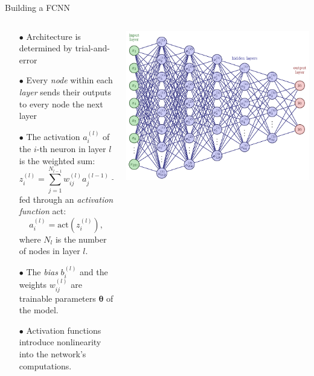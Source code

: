 \documentclass[aspectratio=169, 9pt]{beamer}
\begin{document}
\begin{frame}{Building a FCNN}
  \begin{columns}
    \begin{column}{0.5\textwidth}
      \begin{itemize}
        \item[$\bullet$] Architecture is determined by trial-and-error
        \item[$\bullet$] Every \emph{node} within each \emph{layer} sends their outputs to every node the next layer
        \item[$\bullet$] The activation $a_i^{(l)}$ of the $i$-th neuron in layer $l$ is the weighted sum:
          \begin{equation}
           z_i^{(l)} = \sum_{j=1}^{N_{l-1}}w_{ij}^{(l)}a_j^{(l-1)} + b_i^{(l)}
          \end{equation}
        fed through an \emph{activation function} act:
        \begin{equation}
          a_i^{(l)} = \text{act} \left( z_i^{(l)} \right),
        \end{equation}
          where $N_{l}$ is the number of nodes in layer \(l\).

      \item[$\bullet$] The \emph{bias} \(b_i^{(l)}\) and the weights \(w_{ij}^{(l)}\) are trainable parameters \(\boldsymbol \theta\) of the model.
      \item[$\bullet$] Activation functions introduce nonlinearity into the network's computations.
    \end{itemize}
    \end{column}
    \begin{column}{0.5\textwidth}
      \includegraphics[width=1.0\textwidth]{figures/FFNN_architecture.pdf}
    \end{column}
  \end{columns}
\end{frame}
\end{document}
